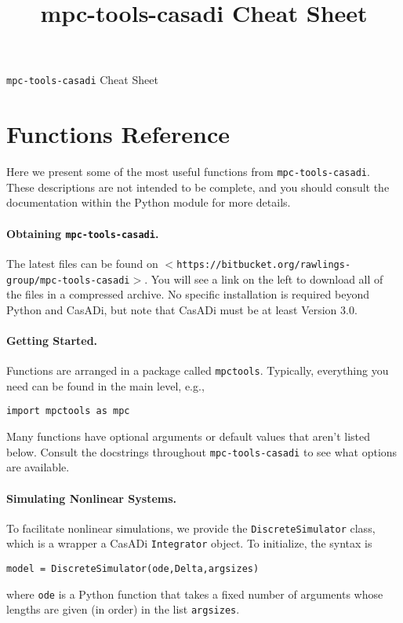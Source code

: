 \documentclass{article}
\title{mpc-tools-casadi Cheat Sheet}
\newcommand{\smallurl}[2][\scriptsize]{\texttt{#1$<$#2$>$}}
\newcommand{\casadi}{CasADi}
\begin{document}
\begin{center}
    \LARGE \texttt{mpc-tools-casadi} Cheat Sheet
\end{center}

\section{Functions Reference}

Here we present some of the most useful functions from \texttt{mpc-tools-casadi}.
These descriptions are not intended to be complete, and you should consult the documentation within the Python module for more details.

\begin{multicols}{2}

\paragraph*{Obtaining \texttt{mpc-tools-casadi}.}

The latest files can be found on \smallurl{https://bitbucket.org/rawlings-group/mpc-tools-casadi}.
You will see a link on the left to download all of the files in a compressed archive.
No specific installation is required beyond Python and \casadi{}, but note that \casadi{} must be at least Version 3.0.

\paragraph*{Getting Started.}

Functions are arranged in a package called \texttt{mpctools}.
Typically, everything you need can be found in the main level, e.g.,
%
\begin{lstlisting}[frame=L]
import mpctools as mpc
\end{lstlisting}

Many functions have optional arguments or default values that aren't listed below.
Consult the docstrings throughout \texttt{mpc-tools-casadi} to see what options are available.

\paragraph*{Simulating Nonlinear Systems.}

To facilitate nonlinear simulations, we provide the \texttt{DiscreteSimulator} class, which is a wrapper a \casadi{} \texttt{Integrator} object.
To initialize, the syntax is
%
\begin{lstlisting}[frame=L]
model = DiscreteSimulator(ode,Delta,argsizes)
\end{lstlisting}
%
where \texttt{ode} is a Python function that takes a fixed number of arguments whose lengths are given (in order) in the list \texttt{argsizes}.


\end{multicols}
\end{document}
